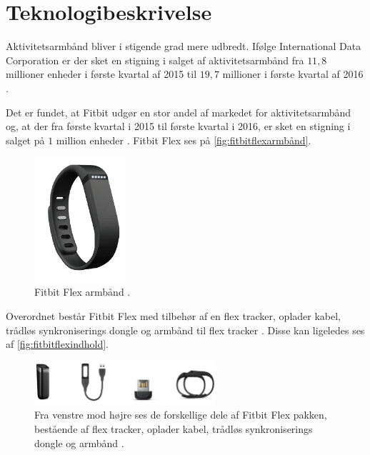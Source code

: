 
\section{Teknologibeskrivelse} \label{sec:teknologibeskrivelse}
Aktivitetsarmbånd bliver i stigende grad mere udbredt. Ifølge International Data Corporation er der sket en stigning i salget af aktivitetsarmbånd fra $11,8$ millioner enheder i første kvartal af 2015 til $19,7$ millioner i første kvartal af 2016 \citep{IDC2016}.

Det er fundet, at Fitbit udgør en stor andel af markedet for aktivitetsarmbånd og, at der fra første kvartal i 2015 til første kvartal i 2016, er sket en stigning i salget på $1$ million enheder \citep{IDC2016}.  
Fitbit Flex ses på \autoref{fig:fitbitflexarmbånd}. 

\begin{figure}[H]
	\centering
	\includegraphics[width=0.3\textwidth]{figures/fitbitflex}
	\caption{Fitbit Flex armbånd \citep{fitbitflex}.}
	\label{fig:fitbitflexarmbånd}
\end{figure}

\noindent
Overordnet består Fitbit Flex med tilbehør af en flex tracker, oplader kabel, trådløs synkroniserings dongle og armbånd til flex tracker \citep{fitbitflex}. Disse kan ligeledes ses af \autoref{fig:fitbitflexindhold}. 

\begin{figure}[H]
	\centering
	\includegraphics[width=0.6\textwidth]{figures/fitbitflexindhold}
	\caption{Fra venstre mod højre ses de forskellige dele af Fitbit Flex pakken, bestående af flex tracker, oplader kabel, trådløs synkroniserings dongle og armbånd \citep{fitbitflex}.}
	\label{fig:fitbitflexindhold}
\end{figure}

